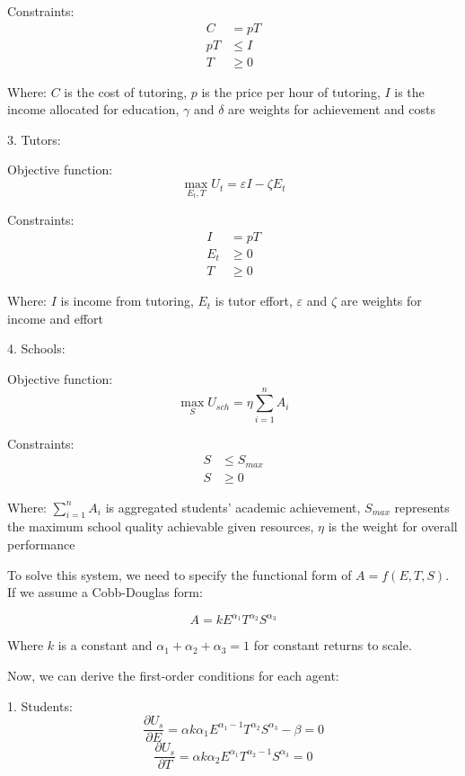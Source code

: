 \documentclass[12pt,a4paper,onecolumn]{article}
\numberwithin{equation}{section}
\begin{document}
Constraints:
\[
\begin{aligned}
    C &= pT \\
    pT &\leq I \\ 
T &\geq 0
\end{aligned}
\]

Where: $C$ is the cost of tutoring, $p$ is the price per hour of tutoring, $I$ is the income allocated for education, $\gamma$ and $\delta$ are weights for achievement and costs

3. Tutors:

Objective function:
\begin{equation}
    \max_{E_t,T} U_t = \varepsilon I - \zeta E_t
\end{equation}

Constraints:
\[
\begin{aligned}
I &= pT \\
E_t &\geq 0 \\
T &\geq 0
\end{aligned}
\]

Where: $I$ is income from tutoring, $E_t$ is tutor effort, $\varepsilon$ and $\zeta$ are weights for income and effort

4. Schools:

Objective function:
\begin{equation}
    \max_{S} U_{sch} = \eta \sum_{i=1}^n A_i
\end{equation}


Constraints:
\[
\begin{aligned}
S &\leq S_{max} \\
S &\geq 0
\end{aligned}
\]

Where: $\sum_{i=1}^{n} A_i$ is aggregated students' academic achievement, $S_{max}$ represents the maximum school quality achievable given resources, $\eta$ is the weight for overall performance

To solve this system, we need to specify the functional form of $A = f(E, T, S)$. If we assume a Cobb-Douglas form:

\[
A = kE^{\alpha_1}T^{\alpha_2}S^{\alpha_3}
\]

Where $k$ is a constant and $\alpha_1 + \alpha_2 + \alpha_3 = 1$ for constant returns to scale.

Now, we can derive the first-order conditions for each agent:

1. Students:
\[
\frac{\partial U_s}{\partial E} = \alpha k\alpha_1 E^{\alpha_1-1}T^{\alpha_2}S^{\alpha_3} - \beta = 0
\]
\[
\frac{\partial U_s}{\partial T} = \alpha k\alpha_2 E^{\alpha_1}T^{\alpha_2-1}S^{\alpha_3} = 0
\]
\end{document}
